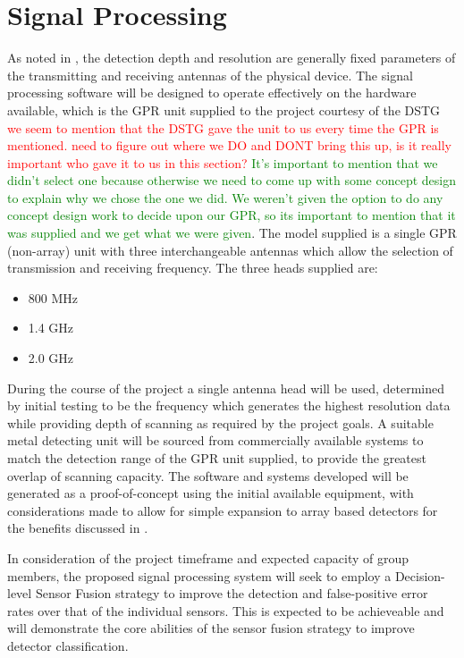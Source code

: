 \documentclass[main.tex]{subfiles}
\begin{document}
\section{Signal Processing}
As noted in , the detection depth and resolution are generally fixed parameters of the transmitting and receiving antennas of the physical device. The signal processing software will be designed to operate effectively on the hardware available, which is the GPR unit supplied to the project courtesy of the DSTG \textcolor{red}{we seem to mention that the DSTG gave the unit to us every time the GPR is mentioned. need to figure out where we DO and DONT bring this up, is it really important who gave it to us in this section?} \textcolor{green}{It's important to mention that we didn't select one because otherwise we need to come up with some concept design to explain why we chose the one we did. We weren't given the option to do any concept design work to decide upon our GPR, so its important to mention that it was supplied and we get what we were given}. The model supplied is a single GPR (non-array) unit with three interchangeable antennas which allow the selection of transmission and receiving frequency. The three heads supplied are:
\begin{itemize}
\item 800 MHz
\item 1.4 GHz
\item 2.0 GHz
\end{itemize}
During the course of the project a single antenna head will be used, determined by initial testing to be the frequency which generates the highest resolution data while providing depth of scanning as required by the project goals. A suitable metal detecting unit will be sourced from commercially available systems to match the detection range of the GPR unit supplied, to provide the greatest overlap of scanning capacity.
The software and systems developed will be generated as a proof-of-concept using the initial available equipment, with considerations made to allow for simple expansion to array based detectors for the benefits discussed in . 

In consideration of the project timeframe and expected capacity of group members, the proposed signal processing system will seek to employ a Decision-level Sensor Fusion strategy to improve the detection and false-positive error rates over that of the individual sensors. This is expected to be achieveable and will demonstrate the core abilities of the sensor fusion strategy to improve detector classification. \\
\end{document}
